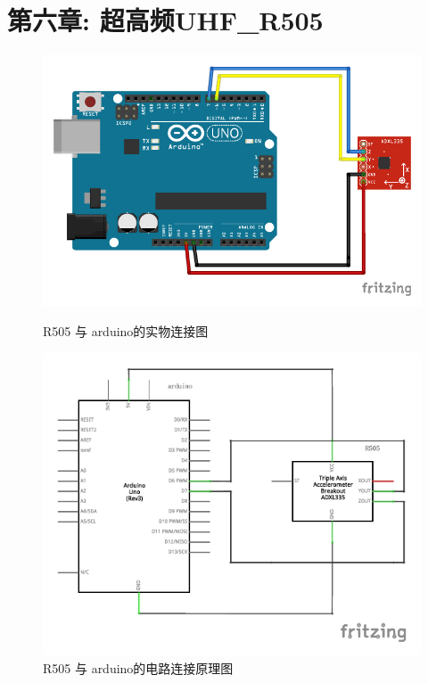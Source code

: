 \documentclass{article}
\begin{document}
\section{第六章: 超高频UHF\_R505}
\begin{figure}[h]
	\centering
	\begin{minipage}{.45\textwidth}
		\centering
		\includegraphics[width=\linewidth]{../Picture/R505.pdf}
		\caption{R505 与 arduino的实物连接图}
		\label{fig:R505 与 arduino的实物连接图}
	\end{minipage}
	\hfill
	\begin{minipage}{.45\textwidth}
		\centering
		\includegraphics[width=\linewidth]{../Picture/R505_line.pdf}
		\caption{R505 与 arduino的电路连接原理图}
		\label{fig:R505 与 arduino的电路连接原理图}
	\end{minipage}
\end{figure}
\end{document}

